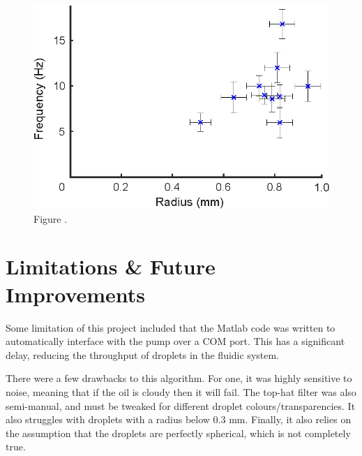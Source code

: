 \documentclass{physics_article_B}
\begin{document}
        \begin{figure}[H]
            \centering
            \includegraphics{Figures/r_vs_f.eps}
            \caption{Figure .} 	
            \label{fig:rvsf}
        \end{figure} 
        
        
\section{Limitations \& Future Improvements}
    
    Some limitation of this project included that the Matlab code was written to automatically interface with the pump over a COM port. This has a significant delay, reducing the throughput of droplets in the fluidic system.
    
    There were a few drawbacks to this algorithm. For one, it was highly sensitive to noise, meaning that if the oil is cloudy then it will fail. The top-hat filter was also semi-manual, and must be tweaked for different droplet colours/transparencies. It also struggles with droplets with a radius below 0.3 mm. Finally, it also relies on the assumption that the droplets are perfectly spherical, which is not completely true.
    
\end{document}
